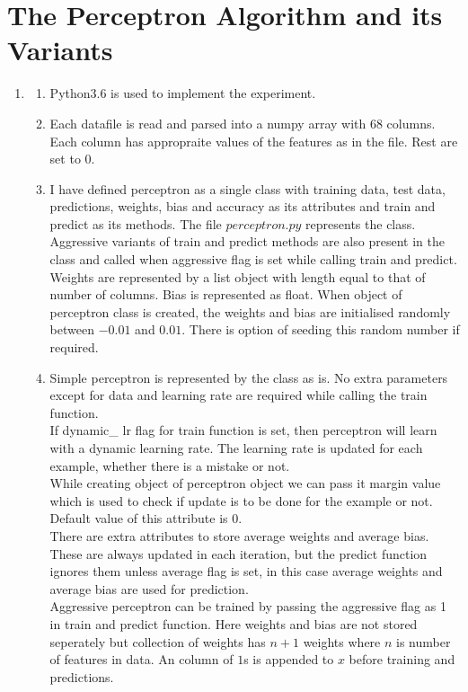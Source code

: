 \section{The Perceptron Algorithm and its Variants}\label{sec:q3}

\begin{enumerate}

	\item
		\begin{enumerate}
	
			\item Python3.6 is used to implement the experiment.\\
			\item Each datafile is read and parsed into a numpy array with 68 columns. Each column has appropraite values of the features as in the file. Rest are set to 0.\\
			\item I have defined perceptron as a single class with training data, test data, predictions, weights, bias and accuracy as its attributes and train and predict as its methods. The file $perceptron.py$ represents the class. Aggressive variants of train and predict methods are also present in the class and called when aggressive flag is set while calling train and predict. Weights are represented by a list object with length equal to that of number of columns. Bias is represented as float. When object of perceptron class is created, the weights and bias are initialised randomly between $-0.01$ and $0.01$. There is option of seeding this random number if required.\\
			
			\item Simple perceptron is represented by the class as is. No extra parameters except for data and learning rate are required while calling the train function.\\
				If dynamic\_ lr flag for train function is set, then perceptron will learn with a dynamic learning rate. The learning rate is updated for each example, whether there is a mistake or not.\\
				While creating object of perceptron object we can pass it margin value which is used to check if update is to be done for the example or not. Default value of this attribute is $0$.\\
				There are extra attributes to store average weights and average bias. These are always updated in each iteration, but the predict function ignores them unless average flag is set, in this case average weights and average bias are used for prediction.\\ 
				Aggressive perceptron can be trained by passing the aggressive flag as 1 in train and predict function. Here weights and bias are not stored seperately but collection of weights has $n+1$ weights where $n$ is number of features in data. An column of $1$s is appended to $x$ before training and predictions.
		\end{enumerate}	
	

\end{enumerate}
